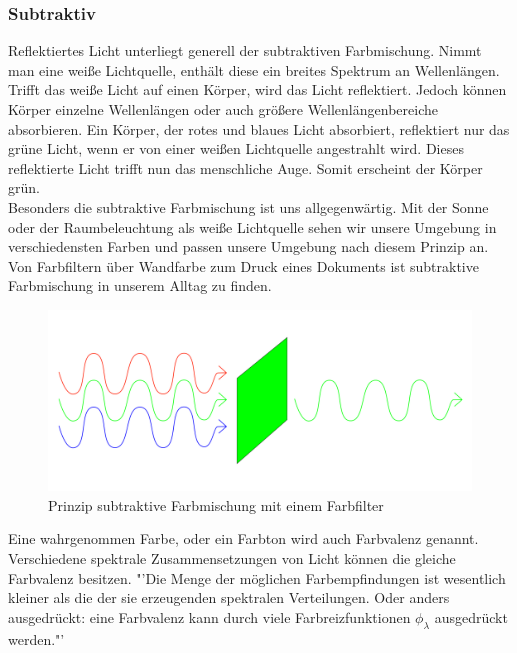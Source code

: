 \documentclass[11pt]{scrartcl}
\begin{document}
\subsubsection{Subtraktiv}
Reflektiertes Licht unterliegt generell der subtraktiven Farbmischung. Nimmt man eine weiße Lichtquelle, enthält diese ein breites Spektrum an Wellenlängen.
Trifft das weiße Licht auf einen Körper, wird das Licht reflektiert. Jedoch können Körper einzelne Wellenlängen oder auch größere Wellenlängenbereiche
absorbieren. Ein Körper, der rotes und blaues Licht absorbiert, reflektiert nur das grüne Licht, wenn er von einer weißen Lichtquelle angestrahlt wird. 
Dieses reflektierte Licht trifft nun das menschliche Auge. Somit erscheint der Körper grün.
\cite[62]{lichtquellen}\\
Besonders die subtraktive Farbmischung ist uns allgegenwärtig. Mit der Sonne oder der Raumbeleuchtung als weiße Lichtquelle sehen wir unsere Umgebung in
verschiedensten Farben und passen unsere Umgebung nach diesem Prinzip an. Von Farbfiltern über Wandfarbe zum Druck eines Dokuments ist subtraktive
Farbmischung in unserem Alltag zu finden.
\vspace{-10pt}
\begin{figure}[H]
    \begin{center}
        \includegraphics[width=.7\textwidth]{images/substractive_color_mixing.png}
    \end{center}
    \caption{Prinzip subtraktive Farbmischung mit einem Farbfilter}
\end{figure}
\noindent
Eine wahrgenommen Farbe, oder ein Farbton wird auch Farbvalenz genannt. Verschiedene spektrale Zusammensetzungen von Licht können die gleiche Farbvalenz besitzen.
"'Die Menge der möglichen Farbempfindungen ist wesentlich kleiner als die der sie erzeugenden spektralen Verteilungen. Oder anders ausgedrückt: eine Farbvalenz
kann durch viele Farbreizfunktionen $\phi_\lambda$ ausgedrückt werden."'\cite[63]{lichtquellen}
\clearpage

\end{document}
